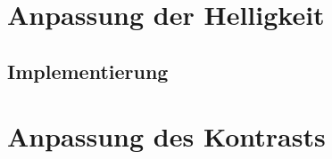 \documentclass[a4paper, fontsize=10pt, DIV=9, parskip=half, headings=small]{scrartcl}
\begin{document}
%
\section{Anpassung der Helligkeit}
%
\subsection{Implementierung}
%
\section{Anpassung des Kontrasts}
%
\end{document}
